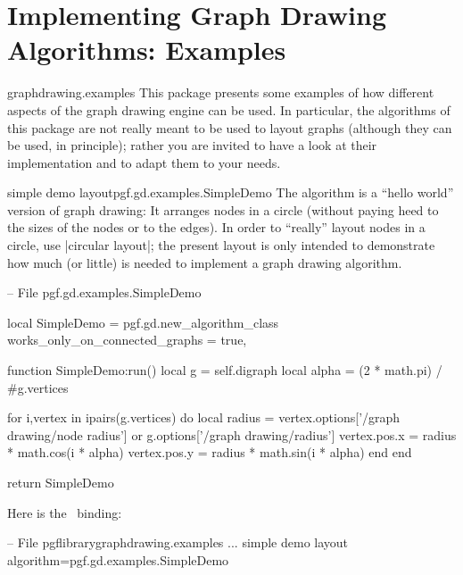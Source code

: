 %
%
%

\section{Implementing Graph Drawing Algorithms: Examples}
\label{section-gd-implementation-last}


\begin{tikzlibrary}{graphdrawing.examples}
  This package presents some examples of how different aspects of the
  graph drawing engine can be used. In particular, the algorithms of
  this package are not really meant to be used to layout graphs
  (although they can be used, in principle); rather you are invited to
  have a look at their implementation and to adapt them to your
  needs. 
\end{tikzlibrary}


\begin{gdalgorithm}{simple demo layout}{pgf.gd.examples.SimpleDemo}
  The algorithm is a ``hello world'' version of graph drawing: It
  arranges nodes in a circle (without paying heed to the sizes of the
  nodes or to the edges). In order to ``really'' layout nodes in a
  circle, use |circular layout|; the present layout is only intended
  to demonstrate how much (or little) is needed to implement a graph
  drawing algorithm.
\begin{codeexample}
-- File pgf.gd.examples.SimpleDemo

local SimpleDemo = pgf.gd.new_algorithm_class {
  works_only_on_connected_graphs = true,
}

function SimpleDemo:run()
  local g = self.digraph
  local alpha = (2 * math.pi) / #g.vertices

  for i,vertex in ipairs(g.vertices) do
    local radius = vertex.options['/graph drawing/node radius'] or g.options['/graph drawing/radius']
    vertex.pos.x = radius * math.cos(i * alpha)
    vertex.pos.y = radius * math.sin(i * alpha)
  end
end

return SimpleDemo
\end{codeexample}
Here is the \tikzname\ binding:
\begin{codeexample}
-- File pgflibrarygraphdrawing.examples
...  
                         {simple demo layout}
                         {algorithm=pgf.gd.examples.SimpleDemo}
\end{codeexample}

\end{gdalgorithm}


